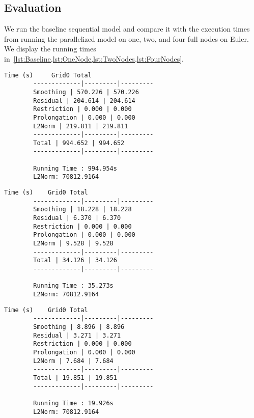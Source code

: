 \documentclass{article}
\begin{document}
    \subsection*{Evaluation}
    \label{subsec:Task1Eval}

    We run the baseline sequential model and compare it with the execution
    times from running the parallelized model on one, two, and four full nodes
    on Euler.
    We display the running times
    in~\cref{lst:Baseline,lst:OneNode,lst:TwoNodes,lst:FourNodes}.

    \begin{lstlisting}[basicstyle=\scriptsize, caption={Output from running
    the baseline sequential model on one full node.}, label={lst:Baseline}]
        Time (s)     Grid0 Total
        -------------|---------|---------
        Smoothing | 570.226 | 570.226
        Residual | 204.614 | 204.614
        Restriction | 0.000 | 0.000
        Prolongation | 0.000 | 0.000
        L2Norm | 219.811 | 219.811
        -------------|---------|---------
        Total | 994.652 | 994.652
        -------------|---------|---------

        Running Time : 994.954s
        L2Norm: 70812.9164
    \end{lstlisting}
    \begin{lstlisting}[basicstyle=\scriptsize, caption={Output from running
    the parallelized model on one full node.}, label={lst:OneNode}]
        Time (s)    Grid0 Total
        -------------|---------|---------
        Smoothing | 18.228 | 18.228
        Residual | 6.370 | 6.370
        Restriction | 0.000 | 0.000
        Prolongation | 0.000 | 0.000
        L2Norm | 9.528 | 9.528
        -------------|---------|---------
        Total | 34.126 | 34.126
        -------------|---------|---------

        Running Time : 35.273s
        L2Norm: 70812.9164
    \end{lstlisting}
    \begin{lstlisting}[basicstyle=\scriptsize, caption={Output from running
    the parallelized model on two full nodes.}, label={lst:TwoNodes}]
        Time (s)    Grid0 Total
        -------------|---------|---------
        Smoothing | 8.896 | 8.896
        Residual | 3.271 | 3.271
        Restriction | 0.000 | 0.000
        Prolongation | 0.000 | 0.000
        L2Norm | 7.684 | 7.684
        -------------|---------|---------
        Total | 19.851 | 19.851
        -------------|---------|---------

        Running Time : 19.926s
        L2Norm: 70812.9164
    \end{lstlisting}
\end{document}
